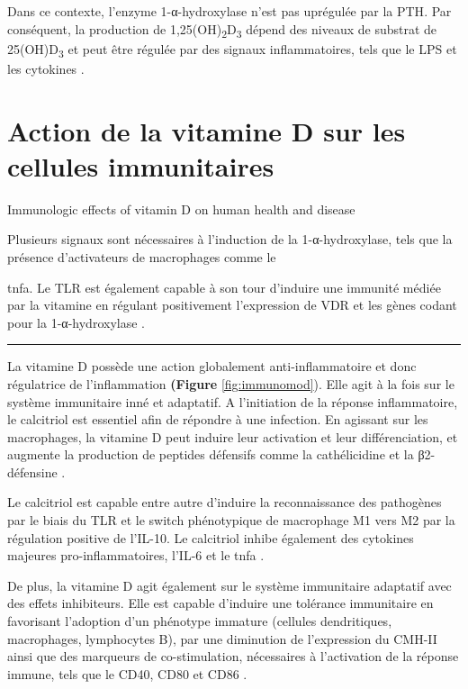 \documentclass[
  a4paper,
  DIV=11,
  numbers=noendperiod,
  listof=totoc]{scrreprt}
\begin{document}
Dans ce contexte, l'enzyme 1-α-hydroxylase n'est pas uprégulée par la
\ac{PTH}. Par conséquent, la production de
1,25(OH)\textsubscript{2}D\textsubscript{3} dépend des niveaux de
substrat de 25(OH)D\textsubscript{3} et peut être régulée par des
signaux inflammatoires, tels que le \ac{LPS} et les cytokines
\autocite{Giannini.2022}.

\hypertarget{action-de-la-vitamine-d-sur-les-cellules-immunitaires}{%
\section{Action de la vitamine D sur les cellules
immunitaires}\label{action-de-la-vitamine-d-sur-les-cellules-immunitaires}}

Immunologic effects of vitamin D on human health and disease
\textcite{Charoenngam.2020}

Plusieurs signaux sont nécessaires à l'induction de la 1-α-hydroxylase,
tels que la présence d'activateurs de macrophages comme le

\ac{tnfa}. Le \ac{TLR} est également capable à son tour d'induire une
immunité médiée par la vitamine en régulant positivement l'expression de
VDR et les gènes codant pour la 1-α-hydroxylase \autocite{Liu.2006}.

\begin{center}\rule{0.5\linewidth}{0.5pt}\end{center}

La vitamine D possède une action globalement anti-inflammatoire et donc
régulatrice de l'inflammation \textbf{(Figure} \ref{fig:immunomod}).
Elle agit à la fois sur le système immunitaire inné et adaptatif. A
l'initiation de la réponse inflammatoire, le calcitriol est essentiel
afin de répondre à une infection. En agissant sur les macrophages, la
vitamine D peut induire leur activation et leur différenciation, et
augmente la production de peptides défensifs comme la cathélicidine et
la β2-défensine \autocite{Caprio.2017}.

Le calcitriol est capable entre autre d'induire la reconnaissance des
pathogènes par le biais du TLR et le switch phénotypique de macrophage
M1 vers M2 par la régulation positive de l'\ac{IL-10}. Le calcitriol
inhibe également des cytokines majeures pro-inflammatoires, l'\ac{IL-6}
et le \ac{tnfa} \autocite{Meza-Meza.2022,Caprio.2017}.

De plus, la vitamine D agit également sur le système immunitaire
adaptatif avec des effets inhibiteurs. Elle est capable d'induire une
tolérance immunitaire en favorisant l'adoption d'un phénotype immature
(cellules dendritiques, macrophages, lymphocytes B), par une diminution
de l'expression du \ac{CMH-II} ainsi que des marqueurs de
co-stimulation, nécessaires à l'activation de la réponse immune, tels
que le CD40, CD80 et CD86 \autocite{Meza-Meza.2020,Caprio.2017}.
\end{document}
